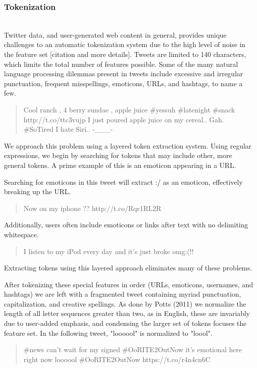 \documentclass[letterpaper]{article}
\begin{document}
\subsubsection{Tokenization}
~\\
Twitter data, and user-generated web content in general, provides unique challenges to an automatic tokenization system due to the high level of noise in the feature set [citation and more details]. Tweets are limited to 140 characters, which limits the total number of features possible. Some of the many natural language processing dilemmas present in tweets include excessive and irregular punctuation, frequent misspellings, emoticons, URLs, and hashtags, to name a few.\\

\begin{quote}
Cool ranch , 4 berry sundae , apple juice \#yessuh \#latenight \#snack http://t.co/ttc3vujp 
I just poured apple juice on my cereal.. Gah. \#SoTired 
I hate Siri.. -\_\_\_- 
\end{quote}

We approach this problem using a layered token extraction system. Using regular expressions, we begin by searching for tokens that may include other, more general tokens. A prime example of this is an emoticon appearing in a URL.

Searching for emoticons in this tweet will extract :/ as an emoticon, effectively breaking up the URL.
\begin{quote}
Now on my iphone ?? http://t.co/Rqr1RL2R 
\end{quote}

Additionally, users often include emoticons or links after text with no delimiting whitespace. 

\begin{quote}
I listen to my iPod every day and it's just broke omg:(!!
\end{quote}

Extracting tokens using this layered approach eliminates many of these problems.

After tokenizing these special features in order (URLs, emoticons, usernames, and hashtags) we are left with a fragmented tweet containing myriad punctuation, capitalization, and creative spellings. As done by Potts (2011) we normalize the length of all letter sequences greater than two, as in English, these are invariably due to user-added emphasis, and condensing the larger set of tokens focuses the feature set. In the following tweet, "loooool" is normalized to "loool".
\begin{quote}
\#news can't wait for my signed \#OoRITE2OutNow it's emotional here right now loooool \#OoRITE2OutNow https://t.co/r4n4cn6C 
\end{quote}
\end{document}

